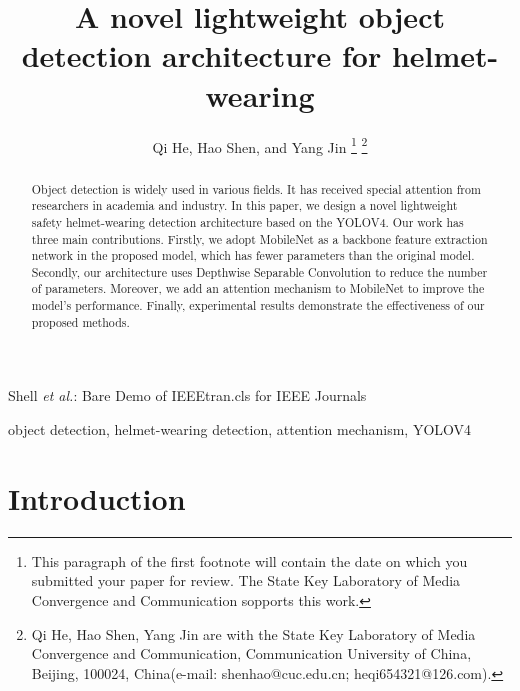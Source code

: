 \documentclass[journal]{IEEEtran}
\begin{document}
\title{A novel lightweight object detection architecture for helmet-wearing}

\author{Qi He, %
Hao Shen, and Yang Jin %
\thanks{This paragraph of the first footnote will contain the date on which you submitted your paper for review. 
The State Key Laboratory of Media Convergence and Communication sopports this work.
}
\thanks{Qi He, Hao Shen, Yang Jin are with the State Key Laboratory of Media Convergence and Communication, Communication University of China, Beijing, 100024, China(e-mail: shenhao@cuc.edu.cn; heqi654321@126.com).}}

\markboth{
}
{Shell \MakeLowercase{\textit{et al.}}: Bare Demo of IEEEtran.cls for IEEE Journals}
\maketitle

\begin{abstract}
Object detection is widely used in various fields. It has received special attention from researchers in academia and industry. In this paper, we design a novel lightweight safety helmet-wearing detection architecture based on the YOLOV4. Our work has three main contributions. Firstly, we adopt MobileNet as a backbone feature extraction network in the proposed model, which has fewer parameters than the original model. Secondly, our architecture uses Depthwise Separable Convolution to reduce the number of parameters. Moreover, we add an attention mechanism to MobileNet to improve the model's performance. Finally, experimental results demonstrate the effectiveness of our proposed methods.
\end{abstract}

\begin{IEEEkeywords}
object detection,  helmet-wearing
detection, attention mechanism, YOLOV4
\end{IEEEkeywords}


\IEEEpeerreviewmaketitle



\section{Introduction}
\end{document}
